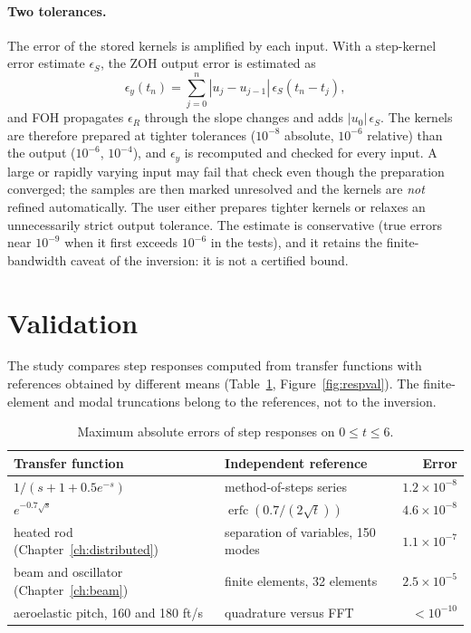 \paragraph{Two tolerances.} The error of the stored kernels is amplified by
each input. With a step-kernel error estimate $\epsilon_S$, the ZOH output
error is estimated as
\begin{equation}
 \epsilon_y(t_n)=\sum_{j=0}^{n}|u_j-u_{j-1}|\,\epsilon_S(t_n-t_j),
\end{equation}
and FOH propagates $\epsilon_R$ through the slope changes and adds
$|u_0|\,\epsilon_S$. The kernels are therefore prepared at tighter
tolerances ($10^{-8}$ absolute, $10^{-6}$ relative) than the output
($10^{-6}$, $10^{-4}$), and $\epsilon_y$ is recomputed and checked for every
input. A large or rapidly varying input may fail that check even though the
preparation converged; the samples are then marked unresolved and the
kernels are \emph{not} refined automatically. The user either prepares
tighter kernels or relaxes an unnecessarily strict output tolerance. The
estimate is conservative (true errors near $10^{-9}$ when it first exceeds
$10^{-6}$ in the tests), and it retains the finite-bandwidth caveat of the
inversion: it is not a certified bound.

\section{Validation}

The study  compares
step responses computed from transfer functions with references obtained by
different means (Table~\ref{tab:respval}, Figure~\ref{fig:respval}). The
finite-element and modal truncations belong to the references, not to the
inversion.

\begin{table}[H]\centering\small
\caption{Maximum absolute errors of step responses on $0\le t\le6$.}\label{tab:respval}
\begin{tabular}{llr}\toprule
Transfer function & Independent reference & Error\\\midrule
$1/(s+1+0.5e^{-s})$ & method-of-steps series & $1.2\times10^{-8}$\\
$e^{-0.7\sqrt s}$ & $\operatorname{erfc}(0.7/(2\sqrt t))$ & $4.6\times10^{-8}$\\
heated rod (Chapter~\ref{ch:distributed}) & separation of variables, 150 modes & $1.1\times10^{-7}$\\
beam and oscillator (Chapter~\ref{ch:beam}) & finite elements, 32 elements & $2.5\times10^{-5}$\\
aeroelastic pitch, 160 and 180 ft/s & quadrature versus FFT & $<10^{-10}$\\
\bottomrule\end{tabular}
\end{table}

